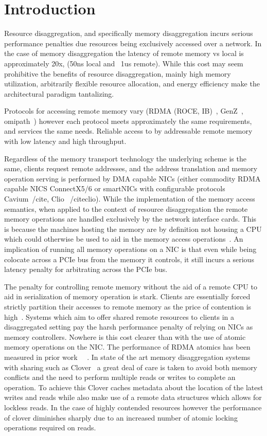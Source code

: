 \section{Introduction}

Resource disaggregation, and specifically memory disaggregation incurs serious
performance penalties due resources being exclusively accessed over a network.
In the case of memory disaggregation the latency of remote memory vs local is
approximately 20x, (50ns local and ~1us remote). While this cost may seem
prohibitive the benefits of resource disaggregation, mainly high memory
utilization, arbitrarily flexible resource allocation, and energy efficiency
make the architectural paradigm tantalizing.

Protocols for accessing remote memory vary (RDMA (ROCE, IB)~\cite{},
GenZ~\cite{}, omipath~\cite{}) however each protocol meets approximately the same
requirements, and services the same needs. Reliable access to by addressable
remote memory with low latency and high throughput.

Regardless of the memory transport technology the underlying scheme is the
same, clients request remote addresses, and the address translation and memory
operation serving is performed by DMA capable NICs (either commodity RDMA capable
NICS ConnectX5/6 or smartNICs with configurable protocols Cavium~/cite{}, Clio
~/cite{clio}). While the implementation of the memory access semantics, when
applied to the context of resource disaggregation the remote memory operations
are handled exclusively by the network interface cards. This is because the
machines hosting the memory are by definition not housing a CPU which could
otherwise be used to aid in the memory access operations~\cite{HERD,SoNUMA,
STORM, (every KV store), RMA-paper}. An implication of running all memory
operations on a NIC is that even while being colocate across a PCIe bus from
the memory it controls, it still incurs a serious latency penalty for
arbitrating across the PCIe bus.

The penalty for controlling remote memory without the aid of a remote CPU to aid
in serialization of memory operation is stark. Clients are essentially forced
strictly partition their accesses to remote memory as the price of contention is
high~\cite{LegoOS, Remote Regions}. Systems which aim to offer shared remote
resources to clients in a disaggregated setting pay the harsh performance
penalty of relying on NICs as memory controllers. Nowhere is this cost clearer
than with the use of atomic memory operations on the NIC. The performance of
RDMA atomics has been measured in prior work ~\cite{requirements for
RDMA}~\cite{Clover}. In state of the art memory disaggregation systems with
sharing such as Clover~\cite{clover} a great deal of care is taken to avoid both
memory conflicts and the need to perform multiple reads or writes to complete an
operation. To achieve this Clover caches metadata about the location of the
latest writes and reads while also make use of a remote data structures which
allows for lockless reads. In the case of highly contended resources however the
performance of clover diminishes sharply due to an increased number of atomic
locking operations required on reads.

